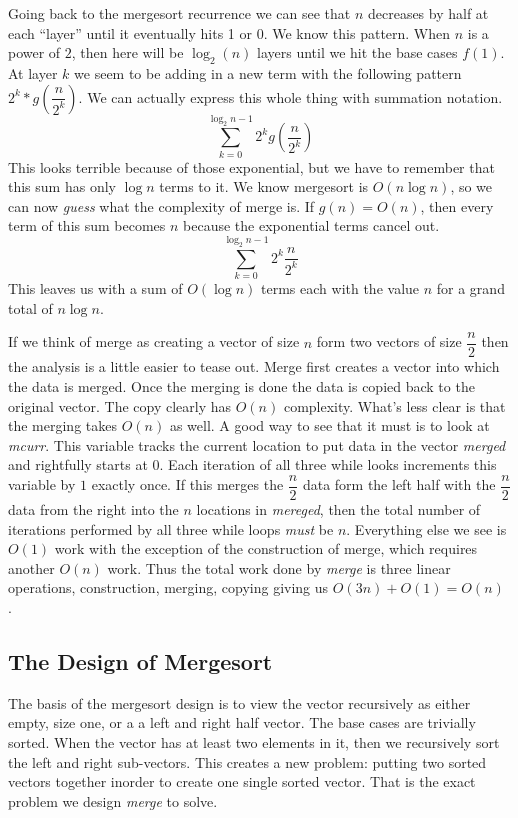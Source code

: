 \documentclass[]{tufte-handout}
\begin{document}
Going back to the mergesort recurrence we can see that $n$ decreases by half at each ``layer'' until it eventually hits 1 or 0. We know this pattern.  When $n$ is a power of $2$, then here will be $\log_2(n)$ layers until we hit the base cases $f(1)$.  At layer $k$ we seem to be adding in a new term with the following pattern $2^k*g(\dfrac{n}{2^k})$. We can actually express this whole thing with summation notation.
\[
\sum\limits_{k=0}^{\log_2{n}-1}2^kg(\dfrac{n}{2^k})
\]
This looks terrible because of those exponential, but we have to remember that this sum has only $\log{n}$ terms to it. We know mergesort is $O(n\log{n})$, so we can now \textit{guess} what the complexity of merge is. If $g(n) = O(n)$, then every term of this sum becomes $n$ because the exponential terms cancel out. 
\[
\sum\limits_{k=0}^{\log_2{n}-1} 2^k\dfrac{n}{2^k}
\]
This leaves us with a sum of $O(\log{n})$ terms each with the value $n$ for a grand total of $n \log{n}$.

If we think of merge as creating a vector of size $n$ form two vectors of size $\dfrac{n}{2}$ then the analysis is a little easier to tease out. Merge first creates a vector into which the data is merged. Once the merging is done the data is copied back to the original vector. The copy clearly has $O(n)$ complexity. What's less clear is that the merging takes $O(n)$ as well. A good way to see that it must is to look at \textit{mcurr}. This variable tracks the current location to put data in the vector \textit{merged} and rightfully starts at $0$. Each iteration of all three while looks increments this variable by $1$ exactly once. If this merges the $\dfrac{n}{2}$ data form the left half with the $\dfrac{n}{2}$ data from the right into the $n$ locations in \textit{mereged}, then the total number of iterations performed by all three while loops \textit{must} be $n$. Everything else we see is $O(1)$ work with the exception of the construction of merge, which requires another $O(n)$ work. Thus the total work done by \textit{merge} is three linear operations, construction, merging, copying giving us $O(3n)+O(1) = O(n)$ . 


\subsection{The Design of Mergesort}

The basis of the mergesort design is to view the vector recursively as either empty, size one, or a a left and right half vector. The base cases are trivially sorted. When the vector has at least two elements in it, then we recursively sort the left and right sub-vectors. This creates a new problem: putting two sorted vectors together inorder to create one single sorted vector. That is the exact problem we design \textit{merge} to solve.  
\end{document}
